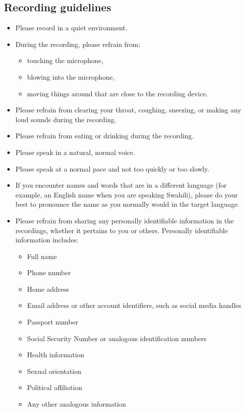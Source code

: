 \subsection{Recording guidelines}\label{appx:guideline:record}
\begin{itemize}
    \item Please record in a quiet environment.
    \item During the recording, please refrain from: 
    \begin{itemize}
        \item touching the microphone,
        \item blowing into the microphone,
        \item moving things around that are close to the recording device.
    \end{itemize}
    \item Please refrain from clearing your throat, coughing, sneezing, or making any loud sounds during the recording.
    \item Please refrain from eating or drinking during the recording.
    \item Please speak in a natural, normal voice.
    \item Please speak at a normal pace and not too quickly or too slowly.
    \item If you encounter names and words that are in a different language (for example, an English name when you are speaking Swahili), please do your best to pronounce the name as you normally would in the target language.
    \item Please refrain from sharing any personally identifiable information in the recordings, whether it pertains to you or others. Personally identifiable information includes:
    \begin{itemize}
        \item Full name
        \item Phone number
        \item Home address
        \item Email address or other account identifiers, such as social media handles
        \item Passport number
        \item Social Security Number or analogous identification numbers
        \item Health information 
        \item Sexual orientation
        \item Political affiliation
        \item Any other analogous information
    \end{itemize}
\end{itemize}

